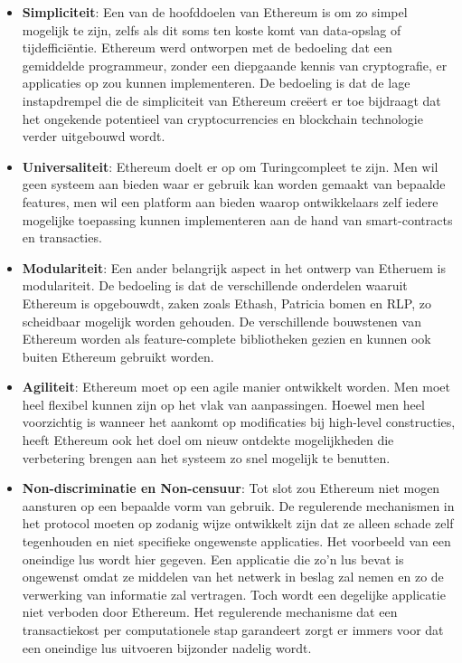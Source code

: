 			\begin{itemize}
				\setlength\itemsep{1em}
				\item \textbf{Simpliciteit}: 
				Een van de hoofddoelen van Ethereum is om zo simpel mogelijk te zijn, zelfs als dit soms ten koste komt van data-opslag of tijdefficiëntie. Ethereum werd ontworpen met de bedoeling dat een gemiddelde programmeur, zonder een diepgaande kennis van cryptografie, er applicaties op zou kunnen implementeren. De bedoeling is dat de lage instapdrempel die de simpliciteit van Ethereum creëert er toe bijdraagt dat het ongekende potentieel van cryptocurrencies en blockchain technologie verder uitgebouwd wordt.
				\item \textbf{Universaliteit}: Ethereum doelt er op om Turingcompleet te zijn. Men wil  geen systeem aan bieden waar er gebruik kan worden gemaakt van bepaalde features, men wil een platform aan bieden waarop ontwikkelaars zelf iedere mogelijke toepassing kunnen implementeren aan de hand van smart-contracts en transacties.
				\item \textbf{Modulariteit}: 
				Een ander belangrijk aspect in het ontwerp van Etheruem is modulariteit. De bedoeling is dat de verschillende onderdelen waaruit Ethereum is opgebouwdt, zaken zoals Ethash, Patricia bomen en RLP, zo scheidbaar mogelijk worden gehouden. De verschillende bouwstenen van Ethereum worden als feature-complete bibliotheken gezien en kunnen ook buiten Ethereum gebruikt worden.
				\item \textbf{Agiliteit}: 
				Ethereum moet op een agile manier ontwikkelt worden. Men moet heel flexibel kunnen zijn op het vlak van aanpassingen. Hoewel men heel voorzichtig is wanneer het aankomt op modificaties bij high-level constructies, heeft Ethereum ook het doel om nieuw ontdekte mogelijkheden die verbetering brengen aan het systeem zo snel mogelijk te benutten.
				\item \textbf{Non-discriminatie en Non-censuur}: 
				Tot slot zou Ethereum niet mogen aansturen op een bepaalde vorm van gebruik. De regulerende mechanismen in het protocol moeten op zodanig wijze ontwikkelt zijn dat ze alleen schade zelf tegenhouden en niet specifieke ongewenste applicaties. Het voorbeeld van een oneindige lus wordt hier gegeven. Een applicatie die zo'n lus bevat is  ongewenst omdat ze middelen van het netwerk in beslag zal nemen en zo de verwerking van informatie zal vertragen. Toch wordt een degelijke applicatie niet verboden door Ethereum. Het regulerende mechanisme dat een transactiekost per computationele stap garandeert zorgt er immers voor dat een oneindige lus uitvoeren bijzonder nadelig wordt.
			\end{itemize}

